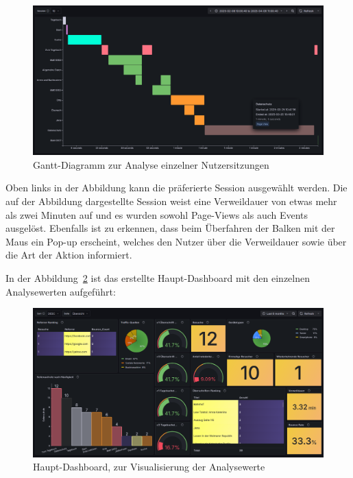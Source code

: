 \begin{figure}[H]
    \centering
    \includegraphics[width=1\textwidth, keepaspectratio]{images/nutzerpfade.png}
    \caption{Gantt-Diagramm zur Analyse einzelner Nutzersitzungen}
    \label{fig:gantt-diagramm}
\end{figure}

Oben links in der Abbildung kann die präferierte Session ausgewählt werden. Die auf der Abbildung dargestellte Session weist eine Verweildauer von etwas mehr als zwei Minuten auf und es wurden sowohl Page-Views als auch Events ausgelöst. Ebenfalls ist zu erkennen, dass beim Überfahren der Balken mit der Maus ein Pop-up erscheint, welches den Nutzer über die Verweildauer sowie über die Art der Aktion informiert.

In der Abbildung~\ref{fig:haupt-dashboard} ist das erstellte Haupt-Dashboard mit den einzelnen Analysewerten aufgeführt:

\begin{figure}[H]
    \centering
    \includegraphics[width=1\textwidth, keepaspectratio]{images/fertiges-dashboard.png}
    \caption{Haupt-Dashboard, zur Visualisierung der Analysewerte}
    \label{fig:haupt-dashboard}
\end{figure}

